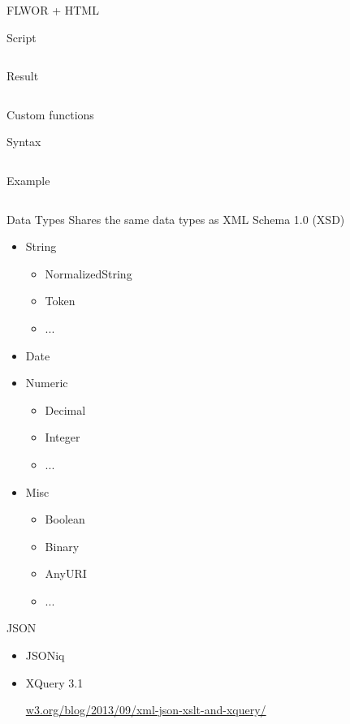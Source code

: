 \documentclass[sans]{beamer}
\begin{document}
\begin{frame}{FLWOR + HTML}
	\begin{block}{Script}
		\inputminted[fontsize=\footnotesize]{html}{codes/ex6.html}
	\end{block}

	\begin{block}{Result}
		\inputminted[fontsize=\footnotesize]{html}{codes/ex7.html}
	\end{block}
\end{frame}

\begin{frame}{Custom functions}
	\begin{block}{Syntax}
		\inputminted[fontsize=\tiny]{xquery}{codes/ex8.xq}
	\end{block}
	\begin{block}{Example}
		\inputminted[fontsize=\tiny]{xquery}{codes/ex9.xq}
	\end{block}
\end{frame}

\begin{frame}{Data Types}
	Shares the same data types as XML Schema 1.0 (XSD)

	\begin{itemize}
		\item String
			\begin{itemize}
				\item NormalizedString
				\item Token
				\item ...
			\end{itemize}
		\item Date
		\item Numeric
			\begin{itemize}
				\item Decimal
				\item Integer
				\item ...
			\end{itemize}
		\item Misc
			\begin{itemize}
				\item Boolean
				\item Binary
				\item AnyURI
				\item ...
			\end{itemize}
	\end{itemize}
\end{frame}

\begin{frame}{JSON}
	\begin{itemize}
		\item JSONiq
		\item XQuery 3.1

		\color{blue} \url{w3.org/blog/2013/09/xml-json-xslt-and-xquery/} \color{black}
	\end{itemize}
\end{frame}
\end{document}
